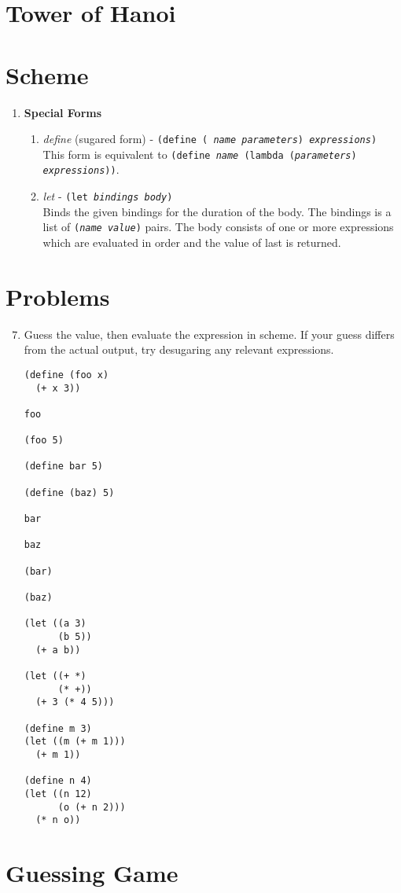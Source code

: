 \section*{Tower of Hanoi}

\vspace{2in}

\section*{Scheme}

\begin{enumerate}
\item {\bf Special Forms}
  \begin{enumerate}
  \item {\large {\it define} (sugared form)} - {\tt (define ({\it
    name parameters}) {\it expressions})}\\ This form is equivalent to
    {\tt (define {\it name} (lambda ({\it parameters}) {\it
    expressions}))}.
    \vspace{.5in}
  \item {\large {\it let}} - {\tt (let {\it bindings body})}\\ Binds the
    given bindings for the duration of the body.  The bindings is a
    list of {\tt ({\it name value})} pairs.  The body consists of one
    or more expressions which are evaluated in order and the value of
    last is returned.
    \vspace{1in}
  \end{enumerate}
\end{enumerate}

\section*{Problems}

\begin{enumerate}
\setcounter{enumi}{6}
\item Guess the value, then evaluate the expression in scheme.  If
your guess differs from the actual output, try desugaring any relevant
expressions.

\begin{verbatim}
(define (foo x)
  (+ x 3))

foo

(foo 5)

(define bar 5)

(define (baz) 5)

bar

baz

(bar)

(baz)

(let ((a 3)
      (b 5))
  (+ a b))

(let ((+ *)
      (* +))
  (+ 3 (* 4 5)))

(define m 3)
(let ((m (+ m 1)))
  (+ m 1))

(define n 4)
(let ((n 12)
      (o (+ n 2)))
  (* n o))

\end{verbatim}

\end{enumerate}

\section*{Guessing Game}


